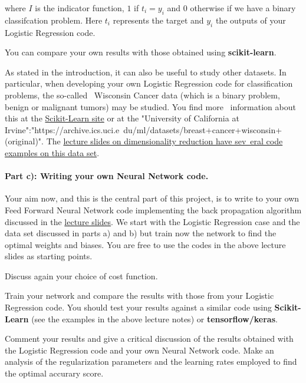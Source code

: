 \documentclass[%
oneside,                 %
final,                   %
10pt]{article}
\begin{document}
where $I$ is the indicator function, $1$ if $t_i = y_i$ and $0$
otherwise if we have a binary classifcation problem. Here $t_i$
represents the target and $y_i$ the outputs of your Logistic
Regression code.


You can compare your own results with those obtained using
\textbf{scikit-learn}.


As stated in the introduction, it can also be useful to study other datasets. In particular, when developing your own	Logistic Regression code for classification problems, the so-called \
Wisconsin Cancer data (which is a binary problem, benign or malignant tumors) may be studied. You find more \
information about this at the \href{{https://scikit-learn.org/stable/modules/generated/sklearn\
.datasets.load_breast_cancer.html}}{Scikit-Learn site} or at the "University	of California at Irvine":"https://archive.ics.uci.e\
du/ml/datasets/breast+cancer+wisconsin+(original)". The	\href{{https://compphysics.github.io/MachineLearning/doc/pub/DimRed/html/DimR\
ed.html}}{lecture slides on dimensionality reduction have sev\
eral code examples on this data set}.


\paragraph{Part c): Writing your own Neural Network code.}
Your aim now, and this is the central part of this project, is to
write to your own Feed Forward Neural Network  code implementing the back
propagation algorithm discussed in the \href{{https://compphysics.github.io/MachineLearning/doc/pub/NeuralNet/html/NeuralNet-bs.html}}{lecture
slides}. We
start with the Logistic Regression  case and the data set discussed in parts a) and b) but train
now the network to find the optimal weights and biases. You are free
to use the codes in the above lecture slides as starting points.

Discuss again your choice of cost function.

Train your network and compare the results with those from your Logistic  Regression code. 
You should test your results against a similar code using \textbf{Scikit-Learn} (see the examples in the above lecture notes) or \textbf{tensorflow/keras}. 

Comment your results and give a critical discussion of the results
obtained with the Logistic Regression code and your own Neural Network
code.  Make an analysis of the regularization parameters and the learning rates employed to find the optimal accurary score.
\end{document}
